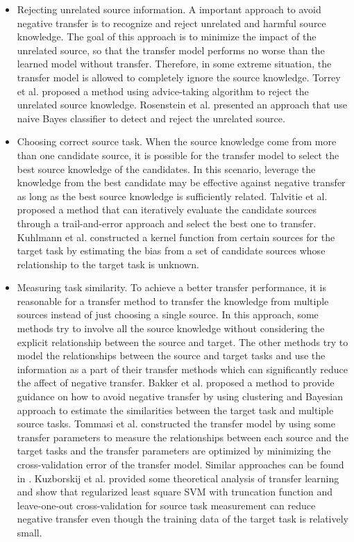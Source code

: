 \begin{itemize}
	\item Rejecting unrelated source information. A important approach to avoid negative transfer is to recognize and reject unrelated and harmful source knowledge. The goal of this approach is to minimize the impact of the unrelated source, so that the transfer model performs no worse than the learned model without transfer. Therefore, in some extreme situation, the transfer model is allowed to completely ignore the source knowledge. 
	Torrey et al. \cite{torrey2005using} proposed a method using advice-taking algorithm to reject the unrelated source knowledge. 
	Rosenstein et al. \cite{rosenstein2005transfer} presented an approach that use naive Bayes classifier to detect and reject the unrelated source.
	\item Choosing correct source task. When the source knowledge come from more than one candidate source, it is possible for the transfer model to select the best source knowledge of the candidates. In this scenario, leverage the knowledge from the best candidate may be effective against negative transfer as long as the best source knowledge is sufficiently related. 
	Talvitie et al. \cite{talvitie2007experts} proposed a method that can iteratively evaluate the candidate sources through a trail-and-error approach and select the best one to transfer. Kuhlmann et al. \cite{kuhlmann2007graph} constructed a kernel function from certain sources for the target task by estimating the bias from a set of candidate sources whose relationship to the target task is unknown.
	\item Measuring task similarity. To achieve a better transfer performance, it is reasonable for a transfer method to transfer the knowledge from multiple sources instead of just choosing a single source. In this approach, some methods try to involve all the source knowledge without considering the explicit relationship between the source and target. The other methods try to model the relationships between the source and target tasks and use the information as a part of their transfer methods which can significantly reduce the affect of negative transfer.
	Bakker et al. \cite{bakker2003task} proposed a method to provide guidance on how to avoid negative transfer by using clustering and Bayesian approach to estimate the similarities between the target task and multiple source tasks.
	Tommasi et al. \cite{tommasi2014learning} constructed the transfer model by using some transfer parameters to measure the relationships between each source and the target tasks and the transfer parameters are optimized by minimizing the cross-validation error of the transfer model. Similar approaches can be found in \cite{jie2011multiclass} \cite{kuzborskij2013n}.
	Kuzborskij et al. \cite{kuzborskij2013stability} provided some theoretical analysis of transfer learning and show that regularized least square SVM with truncation function and leave-one-out cross-validation for source task measurement can reduce negative transfer even though the training data of the target task is relatively small.
\end{itemize}

